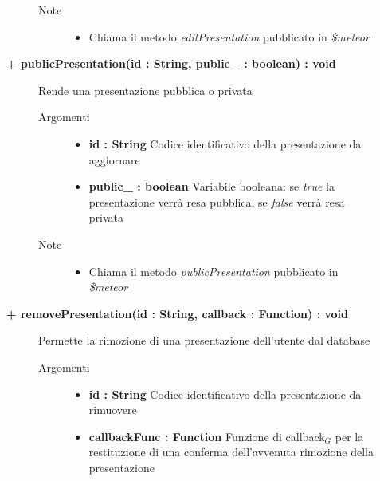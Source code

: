 \begin{description}
\begin{description}
\begin{description}
\begin{itemize}
				\end{itemize}
			\item[Note] \hfill
			\begin{itemize}
					\item Chiama il metodo \textit{editPresentation} pubblicato in \textit{\$meteor}
			\end{itemize}
		\end{description}
	\end{description}


	\begin{description}
		\item[\textbf{\color{blue}+ publicPresentation(id : String, public\_ : boolean) : void			}] \hfill
			Rende una presentazione pubblica o privata
			
		\begin{description}
			\item[Argomenti] \hfill
				\begin{itemize}
					\item \textbf{id : String			} \hfill
					Codice identificativo della presentazione da aggiornare
					\item \textbf{public\_ : boolean			} \hfill
					Variabile booleana: se \textit{true} la presentazione verrà resa pubblica, se \textit{false} verrà resa privata
					
				\end{itemize}
			\item[Note] \hfill
			\begin{itemize}
					\item Chiama il metodo \textit{publicPresentation} pubblicato in \textit{\$meteor}
			\end{itemize}
		\end{description}
	\end{description}


	\begin{description}
		\item[\textbf{\color{blue}+ removePresentation(id : String, callback : Function) : void			}] \hfill
			Permette la rimozione di una presentazione dell'utente dal database
			
		\begin{description}
			\item[Argomenti] \hfill
				\begin{itemize}
					\item \textbf{id : String			} \hfill
					Codice identificativo della presentazione da rimuovere
					\item \textbf{callbackFunc : Function			} \hfill
					Funzione di callback$_G$ per la restituzione di una conferma dell'avvenuta rimozione della presentazione
					

\end{itemize}
\end{description}
\end{description}
\end{description}
